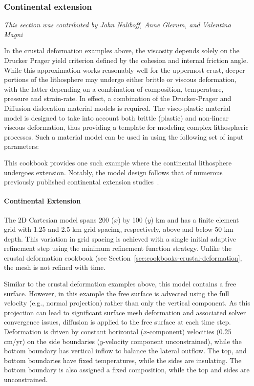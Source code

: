 \subsubsection{Continental extension}
\label{sec:cookbooks-continental-extension}
\textit{This section was contributed by John Naliboff, Anne Glerum, and Valentina Magni}

In the crustal deformation examples above, the viscosity depends solely on the Drucker Prager yield criterion defined by the cohesion and internal friction angle. While this approximation works reasonably well for the uppermost crust, deeper portions of the lithosphere may undergo either brittle or viscous deformation, with the latter depending on a combination of composition, temperature, pressure and strain-rate. In effect, a combination of the Drucker-Prager and Diffusion dislocation material models is required. The visco-plastic material model is designed to take into account both brittle (plastic) and non-linear viscous deformation, thus providing a template for modeling complex lithospheric processes. Such a material model can be used in \aspect{} using the following set of input parameters:



This cookbook provides one such example where the continental lithosphere undergoes extension. Notably, the model design follows that of numerous previously published continental extension studies~\cite[and references therein]{Hui11,Bru14,Nal15}.

\paragraph{Continental Extension}
The 2D Cartesian model spans 200 ($x$) by 100 ($y$) km and has a finite element grid with 1.25 and 2.5 km grid spacing, respectively, above and  below 50 km depth. This variation in grid spacing is achieved with a single initial adaptive refinement step using the minimum refinement function strategy. Unlike the crustal deformation cookbook (see Section~\ref{sec:cookbooks-crustal-deformation}, the mesh is not refined with time.




Similar to the crustal deformation examples above, this model contains a free surface. However, in this example the free surface is advected using the full velocity (e.g., normal projection) rather than only the vertical component. As this projection can lead to significant surface mesh deformation and associated solver convergence issues, diffusion is applied to the free surface at each time step. Deformation is driven by constant horizontal ($x$-component) velocities (0.25 cm/yr) on the side boundaries ($y$-velocity component unconstrained), while the bottom boundary has vertical inflow to balance the lateral outflow. The top, and bottom boundaries have fixed temperatures, while the sides are insulating. The bottom boundary is also assigned a fixed composition, while the top and sides are unconstrained.

